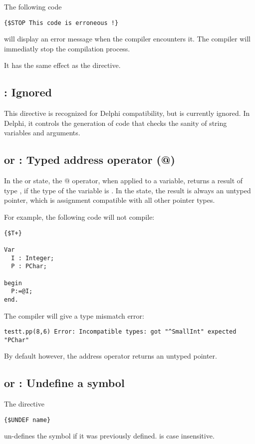 The following code
\begin{verbatim}
{$STOP This code is erroneous !}
\end{verbatim}
will display an error message when the compiler encounters it.
The compiler will immediatly stop the compilation process.

It has the same effect as the  directive.

\subsection{ : Ignored}
This directive is recognized for Delphi compatibility, but is currently
ignored. In Delphi, it controls the generation of code that checks the
sanity of string variables and arguments.

\subsection{ or  : Typed address operator (@)}

In the  or  state, the @ operator,
when applied to a variable, returns a result of type , if the
type of the variable is . In the  state, the result is
always an untyped pointer, which is assignment compatible with all other
pointer types.

For example, the following code will not compile:
\begin{verbatim}
{$T+}

Var
  I : Integer;
  P : PChar;

begin
  P:=@I;
end.
\end{verbatim}
The compiler will give a type mismatch error:
\begin{verbatim}
testt.pp(8,6) Error: Incompatible types: got "^SmallInt" expected "PChar"
\end{verbatim}

By default however, the address operator returns an untyped pointer.

\subsection{ or  : Undefine a symbol}

The directive
\begin{verbatim}
{$UNDEF name}
\end{verbatim}
un-defines the symbol  if it was previously defined.
 is case insensitive.

